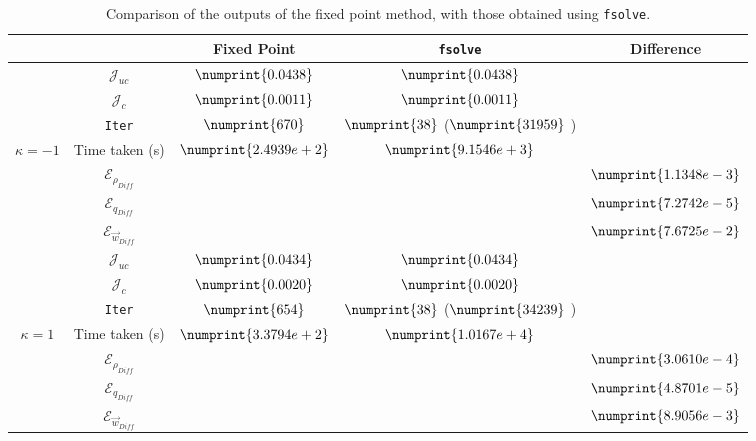 \documentclass[11pt, a4paper]{article}
\theoremstyle{definition}
\newcommand{\adj}{q}
\begin{document}
\begin{table}
	\begin{tabular}{ | c | c || c | c | c ||}
		\hline
		\multicolumn{2}{|c||}{} & Fixed Point & \texttt{fsolve} & Difference   \\
		\hline
		\hline
		& $\mathcal{J}_{uc}$ & $\numprint{0.0438}$ & $\numprint{0.0438}$ &   \\
		& $\mathcal{J}_{c}$ & $\numprint{0.0011}$ & $\numprint{0.0011}$ &   \\
		& \texttt{Iter} & $\numprint{670}$ & $\numprint{38}$ ($\numprint{31959}$ )  &   \\
		$\kappa =-1$ & Time taken (s) & $\numprint{2.4939e+2}$ & $\numprint{9.1546e+3}$ &   \\
		& $\mathcal{E}_{\rho_{Diff}}$ & & &$\numprint{1.1348e-3}$  \\
		& $\mathcal{E}_{\adj_{Diff}}$ & & &$\numprint{7.2742e-5}$  \\
		& $\mathcal{E}_{\vec{w}_{Diff}}$ & & & $\numprint{7.6725e-2}$  \\
		\hline
		& $\mathcal{J}_{uc}$ & $\numprint{0.0434}$ & $\numprint{0.0434}$ &   \\
		& $\mathcal{J}_{c}$ & $\numprint{0.0020}$ & $\numprint{0.0020}$ &   \\
		& \texttt{Iter} & $\numprint{654}$ & $\numprint{38}$ ($\numprint{34239}$ )  &   \\
		$\kappa =1$ & Time taken (s) & $\numprint{3.3794e+2}$ & $\numprint{1.0167e+4}$ &   \\
		& $\mathcal{E}_{\rho_{Diff}}$ & & &$\numprint{3.0610e-4}$  \\
		& $\mathcal{E}_{\adj_{Diff}}$ & & &$\numprint{4.8701e-5}$  \\
		& $\mathcal{E}_{\vec{w}_{Diff}}$ & & & $\numprint{8.9056e-3}$  \\
		\hline
	\end{tabular}
	\caption{Comparison of the outputs of the fixed point method, with those obtained using \texttt{fsolve}.}
	\label{TabA3:Prob1}
\end{table}
\end{document}
